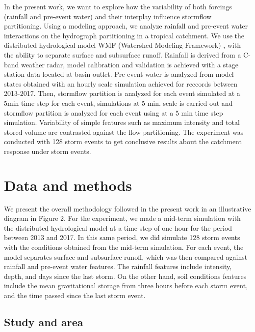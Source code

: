 \documentclass[preprint,12pt]{elsarticle}
\begin{document}
In the present work, we want to explore how the variability of both forcings (rainfall and pre-event water) and their interplay influence stormflow partitioning. Using a modeling approach, we analyze rainfall and pre-event water interactions on the hydrograph partitioning in a tropical catchment. We use the distributed hydrological model WMF (Watershed Modeling Framework) \citep{Frances2007}, with the ability to separate surface and subsurface runoff.  Rainfall is derived from a C-band weather radar, model calibration and validation is achieved with a stage station data located at basin outlet. Pre-event water is analyzed from model states obtained with an hourly scale simulation achieved for reccords between 2013-2017. Then, stormflow partition is analyzed for each event simulated at a 5min time step for each event, simulations at 5 min. scale is carried out and stormflow partition is analyzed for each event using at a 5 min time step simulation. Variability of simple features such as maximum intensity and total stored volume are contrasted against the flow partitioning. The experiment was conducted with 128 storm events to get conclusive results about the catchment response under storm events.\\

\section{Data and methods}
\label{methods}
We present the overall methodology followed in the present work in an illustrative diagram in Figure 2.  For the experiment, we made a mid-term simulation with the distributed hydrological model at a time step of one hour for the period between 2013 and 2017.  In this same period, we did simulate 128 storm events with the conditions obtained from the mid-term simulation.  For each event, the model separates surface and subsurface runoff, which was then compared against rainfall and pre-event water features. The rainfall features include intensity, depth, and days since the last storm.  On the other hand, soil conditions features include the mean gravitational storage from three hours before each storm event, and the time passed since the last storm event.\\

\subsection{Study and area}
\end{document}
